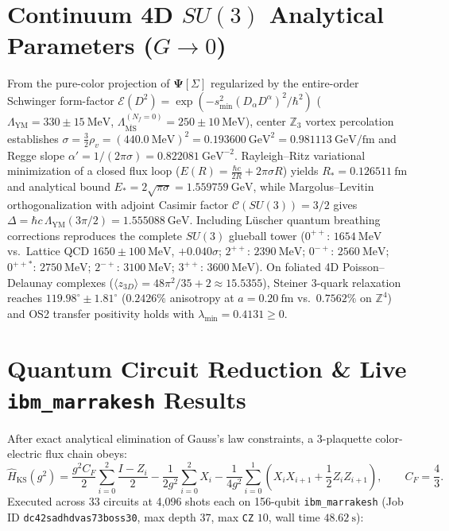 \documentclass[11pt,a4paper]{article}
\begin{document}
\section{Continuum 4D $SU(3)$ Analytical Parameters ($G \to 0$)}
From the pure-color projection of $\mathbf{\Psi}[\Sigma]$ regularized by the entire-order Schwinger form-factor $\mathcal{E}(D^2) = \exp(-s_{\min}^2(D_\alpha D^\alpha)^2/\hbar^2)$ ($\Lambda_{\mathrm{YM}} = 330 \pm 15\ \mathrm{MeV}$, $\Lambda_{\overline{\mathrm{MS}}}^{(N_f=0)} = 250 \pm 10\ \mathrm{MeV}$), center $\mathbb{Z}_3$ vortex percolation establishes $\sigma = \frac{3}{2}\rho_v = (440.0\ \mathrm{MeV})^2 = 0.193600\ \mathrm{GeV}^2 = 0.981113\ \mathrm{GeV/fm}$ and Regge slope $\alpha' = 1/(2\pi\sigma) = 0.822081\ \mathrm{GeV}^{-2}$. Rayleigh--Ritz variational minimization of a closed flux loop ($E(R) = \frac{\hbar c}{2R} + 2\pi\sigma R$) yields $R_* = 0.126511\ \mathrm{fm}$ and analytical bound $E_* = 2\sqrt{\pi\sigma} = 1.559759\ \mathrm{GeV}$, while Margolus--Levitin orthogonalization with adjoint Casimir factor $\mathcal{C}(SU(3)) = 3/2$ gives $\Delta = \hbar c\,\Lambda_{\mathrm{YM}}(3\pi/2) = 1.555088\ \mathrm{GeV}$. Including Lüscher quantum breathing corrections reproduces the complete $SU(3)$ glueball tower ($0^{++}$: $1654\ \mathrm{MeV}$ vs.\ Lattice QCD $1650 \pm 100\ \mathrm{MeV}$, $+0.040\sigma$; $2^{++}$: $2390\ \mathrm{MeV}$; $0^{-+}$: $2560\ \mathrm{MeV}$; $0^{++*}$: $2750\ \mathrm{MeV}$; $2^{-+}$: $3100\ \mathrm{MeV}$; $3^{++}$: $3600\ \mathrm{MeV}$). On foliated 4D Poisson--Delaunay complexes ($\langle z_{3D}\rangle = 48\pi^2/35 + 2 \approx 15.5355$), Steiner 3-quark relaxation reaches $119.98^\circ \pm 1.81^\circ$ ($0.2426\%$ anisotropy at $a=0.20\ \mathrm{fm}$ vs.\ $0.7562\%$ on $\mathbb{Z}^4$) and OS2 transfer positivity holds with $\lambda_{\min} = 0.4131 \ge 0$.

\section{Quantum Circuit Reduction & Live \texttt{ibm\_marrakesh} Results}
After exact analytical elimination of Gauss's law constraints, a 3-plaquette color-electric flux chain obeys:
\begin{equation}
\hat{H}_{\mathrm{KS}}(g^2) = \frac{g^2 C_F}{2}\sum_{i=0}^{2}\frac{I - Z_i}{2} - \frac{1}{2g^2}\sum_{i=0}^{2} X_i - \frac{1}{4g^2}\sum_{i=0}^{1}\left(X_i X_{i+1} + \frac{1}{2}Z_i Z_{i+1}\right), \qquad C_F = \frac{4}{3}.
\end{equation}
Executed across 33 circuits at 4,096 shots each on 156-qubit \texttt{ibm\_marrakesh} (Job ID \texttt{dc42sadhdvas73boss30}, max depth $37$, max \texttt{CZ} $10$, wall time $48.62\ \mathrm{s}$):
\end{document}
